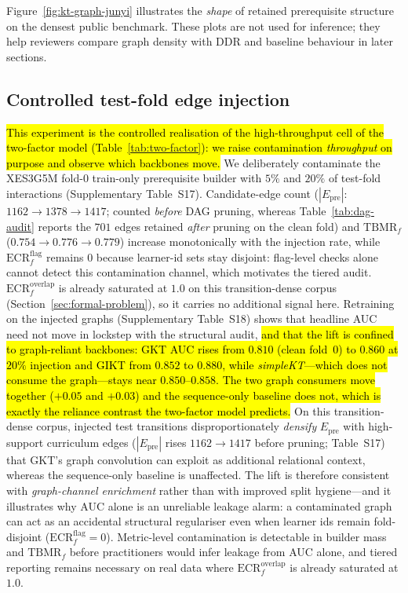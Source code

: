 \documentclass[pdflatex,sn-mathphys-num]{sn-jnl}
\newcommand{\Epre}{\ensuremath{E_{\text{pre}}}}
\newcommand{\DDR}{\textsc{DDR}}
\newcommand{\rev}[1]{\hl{#1}}
\newcommand{\rev}[1]{#1}
\begin{document}
Figure~\ref{fig:kt-graph-junyi} illustrates the \emph{shape} of retained
prerequisite structure on the densest public benchmark. These plots are not
used for inference; they help reviewers compare graph density with \DDR{} and
baseline behaviour in later sections.

\subsection{Controlled test-fold edge injection}
\label{sec:exp-injection}
\rev{This experiment is the controlled realisation of the high-throughput cell of
the two-factor model (\mbox{Table~\ref{tab:two-factor}}): we raise contamination
\emph{throughput} on purpose and observe which backbones move.} We
deliberately contaminate the XES3G5M fold-0 train-only prerequisite builder
with $5\%$ and $20\%$ of test-fold interactions (Supplementary Table~S17).
Candidate-edge count ($|\Epre|$: $1162{\to}1378{\to}1417$; counted
\emph{before} DAG pruning, whereas Table~\ref{tab:dag-audit} reports the
$701$ edges retained \emph{after} pruning on the clean fold) and
$\mathrm{TBMR}_f$ ($0.754{\to}0.776{\to}0.779$) increase monotonically with
the injection rate, while $\mathrm{ECR}^{\mathrm{flag}}_f$ remains $0$
because learner-id sets stay disjoint: flag-level checks alone cannot detect
this contamination channel, which motivates the tiered audit.
$\mathrm{ECR}^{\mathrm{overlap}}_f$ is already saturated at $1.0$ on this
transition-dense corpus (Section~\ref{sec:formal-problem}), so it carries no
additional signal here. Retraining on the injected graphs (Supplementary
Table~S18) shows that headline AUC need not move in lockstep with the
structural audit, \rev{and that the lift is confined to graph-reliant backbones:
GKT AUC rises from \mbox{$0.810$} (clean fold~0) to \mbox{$0.860$} at \mbox{$20\%$} injection and
GIKT from \mbox{$0.852$} to \mbox{$0.880$}, while \textit{simpleKT}---which does not consume
the graph---stays near \mbox{$0.850$}--\mbox{$0.858$}. The two graph consumers move together
(\mbox{$+0.05$} and \mbox{$+0.03$}) and the sequence-only baseline does not, which is exactly
the reliance contrast the two-factor model predicts.} On this transition-dense corpus,
injected test transitions disproportionately \emph{densify} $\Epre$ with
high-support curriculum edges ($|\Epre|$ rises $1162{\to}1417$ before pruning;
Table~S17) that GKT's graph convolution can exploit as additional relational
context, whereas the sequence-only baseline is unaffected. The lift is therefore
consistent with \emph{graph-channel enrichment} rather than with improved
split hygiene---and it illustrates why AUC alone is an unreliable leakage alarm:
a contaminated graph can act as an accidental structural regulariser even when
learner ids remain fold-disjoint ($\mathrm{ECR}^{\mathrm{flag}}_f{=}0$).
Metric-level contamination is detectable in builder mass and $\mathrm{TBMR}_f$
before practitioners would infer leakage from AUC alone, and tiered reporting
remains necessary on real data where $\mathrm{ECR}^{\mathrm{overlap}}_f$ is
already saturated at $1.0$.
\end{document}
